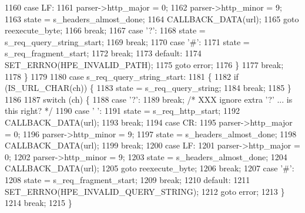 \begin{DoxyCode}
1160           \textcolor{keywordflow}{case} LF:
1161             parser->http_major = 0;
1162             parser->http_minor = 9;
1163             state = s_headers_almost_done;
1164             CALLBACK_DATA(url);
1165             \textcolor{keywordflow}{goto} reexecute\_byte;
1166             \textcolor{keywordflow}{break};
1167           \textcolor{keywordflow}{case} \textcolor{charliteral}{'?'}:
1168             state = s_req_query_string_start;
1169             \textcolor{keywordflow}{break};
1170           \textcolor{keywordflow}{case} \textcolor{charliteral}{'#'}:
1171             state = s_req_fragment_start;
1172             \textcolor{keywordflow}{break};
1173           \textcolor{keywordflow}{default}:
1174             SET_ERRNO(HPE_INVALID_PATH);
1175             \textcolor{keywordflow}{goto} error;
1176         \}
1177         \textcolor{keywordflow}{break};
1178       \}
1179 
1180       \textcolor{keywordflow}{case} s_req_query_string_start:
1181       \{
1182         \textcolor{keywordflow}{if} (IS_URL_CHAR(ch)) \{
1183           state = s_req_query_string;
1184           \textcolor{keywordflow}{break};
1185         \}
1186 
1187         \textcolor{keywordflow}{switch} (ch) \{
1188           \textcolor{keywordflow}{case} \textcolor{charliteral}{'?'}:
1189             \textcolor{keywordflow}{break}; \textcolor{comment}{/* XXX ignore extra '?' ... is this right? */}
1190           \textcolor{keywordflow}{case} \textcolor{charliteral}{' '}:
1191             state = s_req_http_start;
1192             CALLBACK_DATA(url);
1193             \textcolor{keywordflow}{break};
1194           \textcolor{keywordflow}{case} CR:
1195             parser->http_major = 0;
1196             parser->http_minor = 9;
1197             state = s_headers_almost_done;
1198             CALLBACK_DATA(url);
1199             \textcolor{keywordflow}{break};
1200           \textcolor{keywordflow}{case} LF:
1201             parser->http_major = 0;
1202             parser->http_minor = 9;
1203             state = s_headers_almost_done;
1204             CALLBACK_DATA(url);
1205             \textcolor{keywordflow}{goto} reexecute\_byte;
1206             \textcolor{keywordflow}{break};
1207           \textcolor{keywordflow}{case} \textcolor{charliteral}{'#'}:
1208             state = s_req_fragment_start;
1209             \textcolor{keywordflow}{break};
1210           \textcolor{keywordflow}{default}:
1211             SET_ERRNO(HPE_INVALID_QUERY_STRING);
1212             \textcolor{keywordflow}{goto} error;
1213         \}
1214         \textcolor{keywordflow}{break};
1215       \}

\end{DoxyCode}

